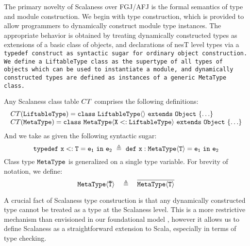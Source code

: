 The primary novelty of Scalaness over FGJ/AFJ is the formal semantics
of type and module construction. We begin with type construction,
which is provided to allow programmers to dynamically construct module
type instances.  The appropriate behavior is obtained by treating
dynamically constructed types as extensions of a basic class of
objects, and declarations of nesT level types via a \tt{typedef}
construct as syntactic sugar for ordinary object construction. We
define a \tt{LiftableType} class as the supertype of all types of
objects which can be used to instantiate a module, and dynamically
constructed types are defined as instances of a generic \tt{MetaType}
class.
\begin{definition}
Any Scalaness class table $\CT$ comprises the following definitions:
$$
\begin{array}{l}
\CT(\tt{LiftableType}) = \gclass{\tt{LiftableType}}{}{Object}{\ldots}\\
\CT(\tt{MetaType}) = \gclass{\tt{MetaType}}{\tt{X <: LiftableType}}{Object}{ \ldots }
\end{array}
$$
And we take as given the following syntactic sugar:
$$
\jtlet{x}{T}{e_1}{e_2}\ \defeq\ \jdef{x}{\jinst{MetaType}{T}}{e_1}{e_2}
$$
Class type $\tt{MetaType}$ is generalized on a single type variable. For brevity of 
notation, we define:
$$
\jinst{\tt{MetaType}}{\ttvec{T}}\quad \defeq \quad \overline{\jinst{MetaType}{T}}
$$
\end{definition}
A crucial fact of Scalaness type construction is that any dynamically
constructed type cannot be treated as a type at the Scalaness
level. This is a more restrictive mechanism than envisioned in our
foundational model \cite{FramedML,FramedMLworkshop}, however it allows us to define
Scalaness as a straightforward extension to Scala, especially in terms
of type checking.

